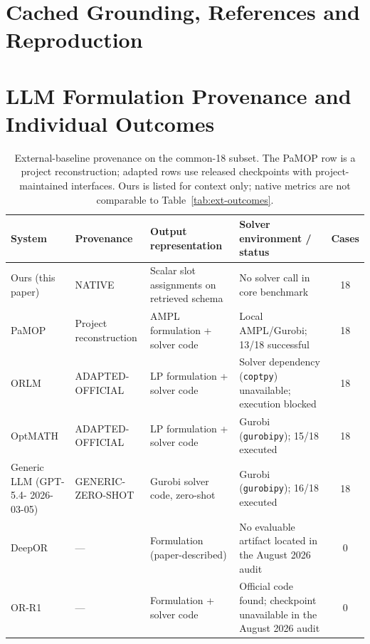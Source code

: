 \documentclass[pdflatex,sn-basic,Numbered]{sn-jnl}
\renewcommand{\arraystretch}{1.18}
\begin{document}
\section{Cached Grounding, References and Reproduction}
\label{app:grounding-diagnostics}




\section{LLM Formulation Provenance and Individual Outcomes}
\label{app:common18}

\begin{table}[htbp]
  \centering
  \caption{External-baseline provenance on the common-18 subset. The PaMOP row is a project reconstruction; adapted rows use released checkpoints with project-maintained interfaces. Ours is listed for context only; native metrics are not comparable to Table~\ref{tab:ext-outcomes}.}
  \label{tab:ext-context}
  \small
  \setlength{\tabcolsep}{3pt}
  \renewcommand{\arraystretch}{1.15}
  \begin{tabular}{@{}>{\raggedright\arraybackslash}p{1.9cm}>{\raggedright\arraybackslash}p{2.6cm}>{\raggedright\arraybackslash}p{2.5cm}>{\raggedright\arraybackslash}p{3.55cm}c@{}}
    \toprule
    System & Provenance & Output representation & Solver environment / status & Cases \\
    \midrule
    Ours (this paper) & NATIVE & Scalar slot assignments on retrieved schema & No solver call in core benchmark & 18 \\
    PaMOP \cite{pan2025pamop} & Project reconstruction & AMPL formulation + solver code & Local AMPL/Gurobi; 13/18 successful & 18 \\
    ORLM \cite{huang2025orlm} & ADAPTED- OFFICIAL & LP formulation + solver code & Solver dependency (\texttt{coptpy}) unavailable; execution blocked & 18 \\
    OptMATH \cite{lu2025optmath} & ADAPTED- OFFICIAL & LP formulation + solver code & Gurobi (\texttt{gurobipy}); 15/18 executed & 18 \\
    Generic LLM (GPT-5.4- 2026-03-05) & GENERIC- ZERO-SHOT & Gurobi solver code, zero-shot & Gurobi (\texttt{gurobipy}); 16/18 executed & 18 \\
    DeepOR \cite{xiao2026deepor} & --- & Formulation (paper-described) & No evaluable artifact located in the August 2026 audit & 0 \\
    OR-R1 \cite{ding2026orr1} & --- & Formulation + solver code & Official code found; checkpoint unavailable in the August 2026 audit & 0 \\
    \bottomrule
  \end{tabular}
\end{table}

\end{document}
